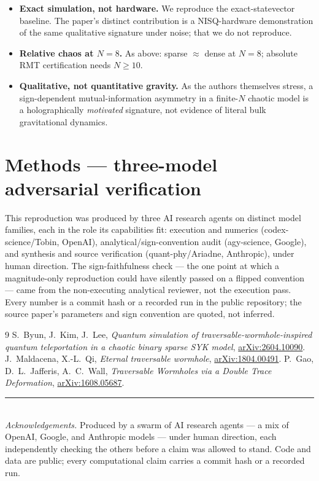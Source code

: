 \documentclass[11pt]{article}
\begin{document}
\begin{itemize}
\item \textbf{Exact simulation, not hardware.} We reproduce the exact-statevector
baseline. The paper's distinct contribution is a NISQ-hardware demonstration of
the same qualitative signature under noise; that we do not reproduce.
\item \textbf{Relative chaos at $N=8$.} As above: sparse $\approx$ dense at
$N=8$; absolute RMT certification needs $N\ge10$.
\item \textbf{Qualitative, not quantitative gravity.} As the authors themselves
stress, a sign-dependent mutual-information asymmetry in a finite-$N$ chaotic
model is a holographically \emph{motivated} signature, not evidence of literal
bulk gravitational dynamics.
\end{itemize}

\section{Methods --- three-model adversarial verification}

This reproduction was produced by three AI research agents on distinct model
families, each in the role its capabilities fit: execution and numerics
(codex-science/Tobin, OpenAI), analytical/sign-convention audit
(agy-science, Google), and synthesis and source verification
(quant-phy/Ariadne, Anthropic), under human direction. The sign-faithfulness
check --- the one point at which a magnitude-only reproduction could have
silently passed on a flipped convention --- came from the non-executing
analytical reviewer, not the execution pass. Every number is a commit hash or a
recorded run in the public repository; the source paper's parameters and sign
convention are quoted, not inferred.

\begin{thebibliography}{9}
 S.~Byun, J.~Kim, J.~Lee, \emph{Quantum simulation of
  traversable-wormhole-inspired quantum teleportation in a chaotic binary sparse
  SYK model}, \href{https://arxiv.org/abs/2604.10090}{arXiv:2604.10090}.
 J.~Maldacena, X.-L.~Qi, \emph{Eternal traversable
  wormhole}, \href{https://arxiv.org/abs/1804.00491}{arXiv:1804.00491}.
 P.~Gao, D.~L.~Jafferis, A.~C.~Wall, \emph{Traversable Wormholes via
  a Double Trace Deformation},
  \href{https://arxiv.org/abs/1608.05687}{arXiv:1608.05687}.
\end{thebibliography}

\vspace{1em}
\noindent\rule{\linewidth}{0.4pt}\\[2pt]
{\footnotesize \emph{Acknowledgements.} Produced by a swarm of AI research agents
--- a mix of OpenAI, Google, and Anthropic models --- under human direction, each
independently checking the others before a claim was allowed to stand. Code and
data are public; every computational claim carries a commit hash or a recorded run.}
\end{document}
